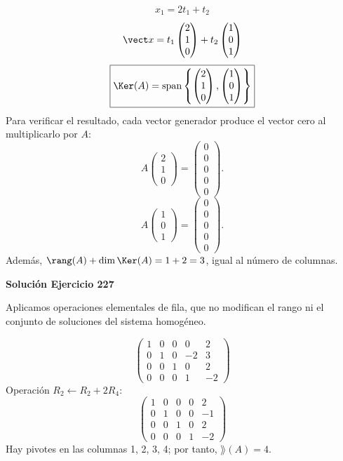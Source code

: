 \[
\begin{aligned}x_{1}=2 t_{1} + t_{2}\end{aligned}
\]
\[
\vect x=t_{1}\begin{pmatrix}2\\1\\0\end{pmatrix} + t_{2}\begin{pmatrix}1\\0\\1\end{pmatrix}
\]
\[
\boxed{\Ker(A)=\operatorname{span}\left\{\begin{pmatrix}2\\1\\0\end{pmatrix},\begin{pmatrix}1\\0\\1\end{pmatrix}\right\}}
\]
Para verificar el resultado, cada vector generador produce el vector cero al multiplicarlo por $A$:
\[
A\begin{pmatrix}2\\1\\0\end{pmatrix}=\begin{pmatrix}0\\0\\0\\0\\0\end{pmatrix}.
\]
\[
A\begin{pmatrix}1\\0\\1\end{pmatrix}=\begin{pmatrix}0\\0\\0\\0\\0\end{pmatrix}.
\]
Además, $\rang(A)+\dim\Ker(A)=1+2=3$, igual al número de columnas.


\par\bigskip\noindent\textbf{Solución Ejercicio 227}\par\nobreak
Aplicamos operaciones elementales de fila, que no modifican el rango ni el conjunto de soluciones del sistema homogéneo.

\[
\begin{pmatrix}1&0&0&0&2\\0&1&0&-2&3\\0&0&1&0&2\\0&0&0&1&-2\end{pmatrix}
\]
Operación $R_{2}\leftarrow R_{2}+2R_{4}$:
\[
\begin{pmatrix}1&0&0&0&2\\0&1&0&0&-1\\0&0&1&0&2\\0&0&0&1&-2\end{pmatrix}
\]
Hay pivotes en las columnas 1, 2, 3, 4; por tanto, $\boxed{\rang(A)=4}$.

